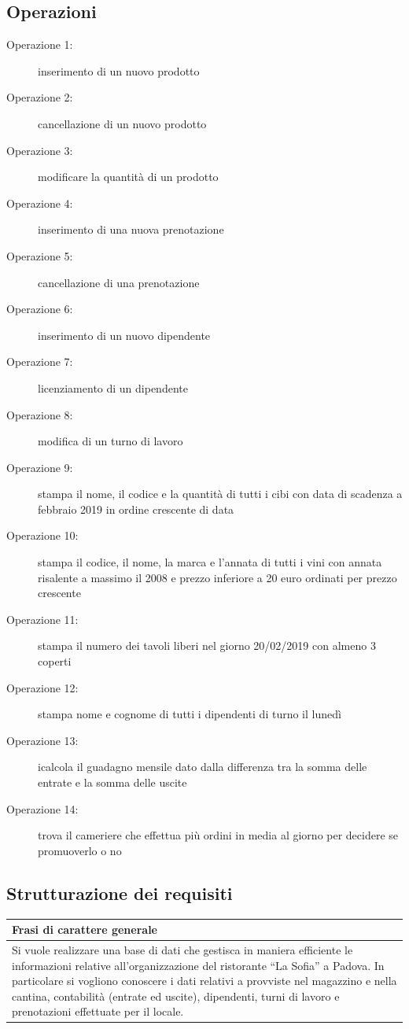 \subsection{Operazioni} %
\begin{description}
    \item [Operazione 1:] inserimento di un nuovo prodotto
    \item [Operazione 2:] cancellazione di un nuovo prodotto
    \item [Operazione 3:] modificare la quantità di un prodotto
    \item [Operazione 4:] inserimento di una nuova prenotazione
    \item [Operazione 5:] cancellazione di una prenotazione
    \item [Operazione 6:] inserimento di un nuovo dipendente
    \item [Operazione 7:] licenziamento di un dipendente
    \item [Operazione 8:] modifica di un turno di lavoro 
    \item [Operazione 9:] stampa il nome, il codice e la quantità di tutti i cibi con data di scadenza a febbraio 2019 in ordine crescente di data
    \item [Operazione 10:] stampa il codice, il nome, la marca e l’annata di tutti i vini con annata risalente a massimo il 2008 e prezzo inferiore a 20 euro ordinati per prezzo crescente
    \item [Operazione 11:] stampa il numero dei tavoli liberi nel giorno 20/02/2019 con almeno 3 coperti 
    \item [Operazione 12:] stampa nome e cognome di tutti i dipendenti di turno il lunedì
    \item [Operazione 13:] icalcola il guadagno mensile dato dalla differenza tra la somma delle entrate e la somma delle uscite
    \item [Operazione 14:] trova il cameriere che effettua più ordini in media al giorno per decidere se promuoverlo o no
\end{description}

\subsection{Strutturazione dei requisiti} 
\begin{longtable}{|p{15.5cm}|}
    \hline
    \textbf{Frasi di carattere generale} \\ \hline
    Si vuole realizzare una base di dati che gestisca in maniera efficiente le informazioni relative all’organizzazione del ristorante “La Sofia” a Padova. In particolare si vogliono conoscere i dati relativi a provviste nel magazzino e nella cantina, contabilità (entrate ed uscite), dipendenti, turni di lavoro e prenotazioni effettuate per il locale. \\ \hline
\end{longtable}

